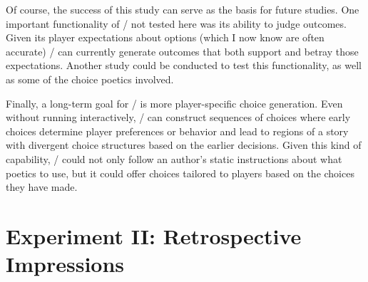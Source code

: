 Of course, the success of this study can serve as the basis for future studies.
%
One important functionality of \dunyazad/ not tested here was its ability to judge outcomes.
%
Given its player expectations about options (which I now know are often accurate) \dunyazad/ can currently generate outcomes that both support and betray those expectations.
%
Another study could be conducted to test this functionality, as well as some of the choice poetics involved.


Finally, a long-term goal for \dunyazad/ is more player-specific choice generation.
%
Even without running interactively, \dunyazad/ can construct sequences of choices where early choices determine player preferences or behavior and lead to regions of a story with divergent choice structures based on the earlier decisions.
%
Given this kind of capability, \dunyazad/ could not only follow an author's static instructions about what poetics to use, but it could offer choices tailored to players based on the choices they have made.

\section{Experiment II: Retrospective Impressions}

\label{sec:exp-retrospective}
